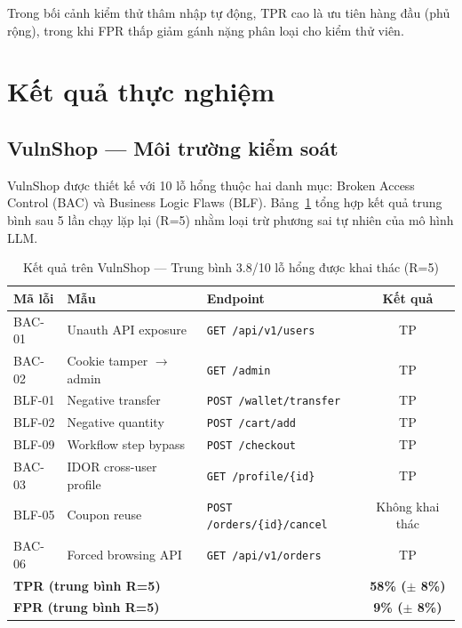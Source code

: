 Trong bối cảnh kiểm thử thâm nhập tự động, TPR cao là ưu tiên hàng đầu (phủ rộng), trong khi FPR thấp giảm gánh nặng phân loại cho kiểm thử viên.

\section{Kết quả thực nghiệm}
\label{sec:results}

\subsection{VulnShop --- Môi trường kiểm soát}

VulnShop được thiết kế với 10 lỗ hổng thuộc hai danh mục: Broken Access Control (BAC) và Business Logic Flaws (BLF). Bảng~\ref{tab:vulnshop} tổng hợp kết quả trung bình sau 5 lần chạy lặp lại (R=5) nhằm loại trừ phương sai tự nhiên của mô hình LLM.

\begin{table}[h]
\centering
\renewcommand{\arraystretch}{1.3}
\caption{Kết quả trên VulnShop --- Trung bình 3.8/10 lỗ hổng được khai thác (R=5)}
\label{tab:vulnshop}
\begin{tabular}{|l|l|l|c|}
\hline
\textbf{Mã lỗi} & \textbf{Mẫu} & \textbf{Endpoint} & \textbf{Kết quả} \\
\hline
BAC-01 & Unauth API exposure & \texttt{GET /api/v1/users} & TP \\
\hline
BAC-02 & Cookie tamper $\to$ admin & \texttt{GET /admin} & TP \\
\hline
BLF-01 & Negative transfer & \texttt{POST /wallet/transfer} & TP \\
\hline
BLF-02 & Negative quantity & \texttt{POST /cart/add} & TP \\
\hline
BLF-09 & Workflow step bypass & \texttt{POST /checkout} & TP \\
\hline
BAC-03 & IDOR cross-user profile & \texttt{GET /profile/\{id\}} & TP \\
\hline
BLF-05 & Coupon reuse & \texttt{POST /orders/\{id\}/cancel} & Không khai thác \\
\hline
BAC-06 & Forced browsing API & \texttt{GET /api/v1/orders} & TP \\
\hline
\multicolumn{3}{|l|}{\textbf{TPR (trung bình R=5)}} & \textbf{58\% ($\pm$ 8\%)} \\
\hline
\multicolumn{3}{|l|}{\textbf{FPR (trung bình R=5)}} & \textbf{9\% ($\pm$ 8\%)} \\
\hline
\end{tabular}
\end{table}

